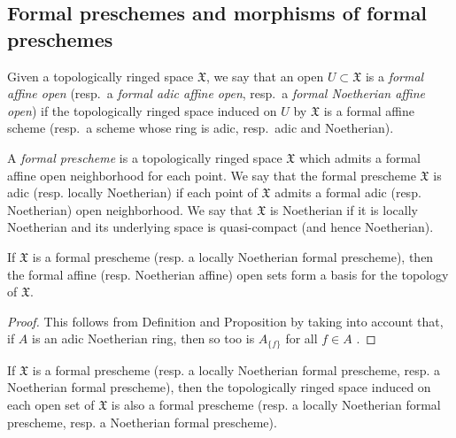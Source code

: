 \subsection{Formal preschemes and morphisms of formal preschemes}
\label{subsection:1.10.4}

\begin{env}[10.4.1]
\label{1.10.4.1}
Given a topologically ringed space $\mathfrak{X}$, we say that an open $U\subset\mathfrak{X}$ is a \emph{formal affine open} (resp.~a \emph{formal adic affine open}, resp.~a \emph{formal Noetherian affine open}) if the topologically ringed space induced on $U$ by $\mathfrak{X}$ is a formal affine scheme (resp.~a scheme whose ring is adic, resp.~adic and Noetherian).
\end{env}

\begin{definition}[10.4.2]
\label{1.10.4.2}
A \emph{formal prescheme} is a topologically ringed space $\mathfrak{X}$ which admits a formal affine open neighborhood for each point.
We say that the formal prescheme $\mathfrak{X}$ is adic (resp. locally Noetherian) if each point of $\mathfrak{X}$ admits a formal adic (resp. Noetherian) open neighborhood.
We say that $\mathfrak{X}$ is Noetherian if it is locally Noetherian and its underlying space is quasi-compact (and hence Noetherian).
\end{definition}

\begin{proposition}[10.4.3]
\label{1.10.4.3}
If $\mathfrak{X}$ is a formal prescheme (resp. a locally Noetherian formal prescheme), then the formal affine (resp. Noetherian affine) open sets form a basis for the topology of $\mathfrak{X}$.
\end{proposition}

\begin{proof}
\label{proof-1.10.4.3}
This follows from Definition  and Proposition  by taking into account that, if $A$ is an adic Noetherian ring, then so too is $A_{\{f\}}$ for all $f\in A$ .
\end{proof}

\begin{corollary}[10.4.4]
\label{1.10.4.4}
If $\mathfrak{X}$ is a formal prescheme (resp. a locally Noetherian formal prescheme, resp. a Noetherian formal prescheme), then the topologically ringed space induced on each open set of $\mathfrak{X}$ is also a formal prescheme (resp. a locally Noetherian formal prescheme, resp. a Noetherian formal prescheme).
\end{corollary}

